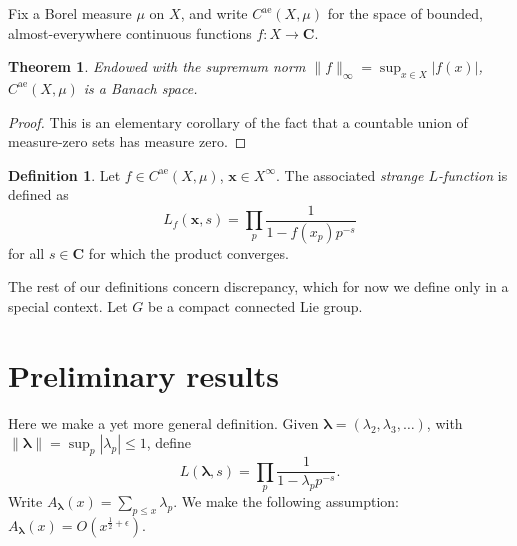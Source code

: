 \documentclass{article}
\newcommand{\bC}{\mathbf{C}}
\newcommand{\blambda}{{\boldsymbol{\lambda}}}
\newcommand{\bx}{\boldsymbol{x}}
\newcommand{\alev}{\mathrm{ae}}
\newtheorem{theorem}[subsection]{Theorem}
\theoremstyle{definition}
\newtheorem{definition}[subsection]{Definition}
\begin{document}
Fix a Borel measure $\mu$ on $X$, and write $C^\alev(X,\mu)$ for the space of 
bounded, almost-everywhere continuous functions $f\colon X\to \bC$. 


\begin{theorem}
Endowed with the supremum norm $\|f\|_\infty=\sup_{x\in X} |f(x)|$, 
$C^\alev(X,\mu)$ is a Banach space. 
\end{theorem}
\begin{proof}
This is an elementary corollary of the fact that a countable union of 
measure-zero sets has measure zero. 
\end{proof}

\begin{definition}
Let $f\in C^\alev(X,\mu)$, $\bx\in X^\infty$. The associated \emph{strange 
$L$-function} is defined as 
\[
	L_f(\bx,s) = \prod_p \frac{1}{1-f(x_p) p^{-s}} 
\]
for all $s\in \bC$ for which the product converges. 
\end{definition}

The rest of our definitions concern discrepancy, which for now we define only 
in a special context. Let $G$ be a compact connected Lie group. 





\section{Preliminary results}\label{sec:prelim-result}

Here we make a yet more general definition. Given 
$\blambda=(\lambda_2,\lambda_3,\dots)$, with 
$\|\blambda\|=\sup_p |\lambda_p|\leqslant 1$, define 
\[
	L(\blambda,s) = \prod_p \frac{1}{1-\lambda_p p^{-s}} .
\]
Write 
$A_\blambda(x) = \sum_{p\leqslant x} \lambda_p$. We make the following 
assumption: $A_\blambda(x) = O(x^{\frac 1 2+\epsilon})$. 
\end{document}
